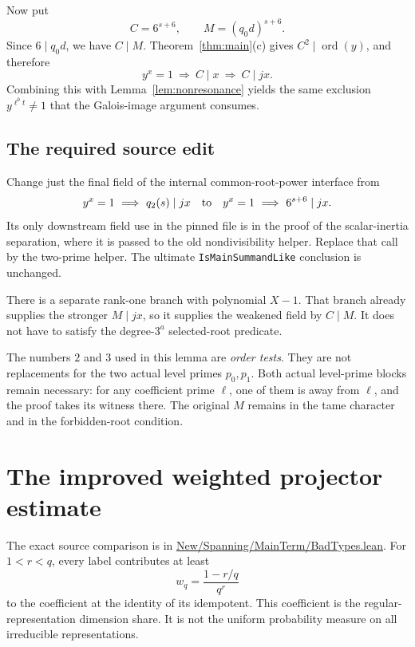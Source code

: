 \documentclass[11pt,a4paper]{article}
\theoremstyle{definition}
\theoremstyle{remark}
\newcommand{\ord}{\operatorname{ord}}
\newcommand{\code}[1]{{\small\nolinkurl{#1}}}
\newcommand{\src}[2]{\href{https://github.com/VladimirReshetnikov/ProveIt/blob/89d12dd40424f1217fd818d84877b3da52396a3b/Analysis/GeneralizedRiemannHypothesis/Lean/grh/src/#1.lean}{#2}}
\begin{document}
Now put
\begin{equation}
               C=6^{s+6},\qquad M=(q_0d)^{s+6}.
               \label{eq:orderC}
\end{equation}
Since \(6\mid q_0d\), we have \(C\mid M\).
Theorem~\ref{thm:main}(c) gives \(C^2\mid\ord(y)\), and therefore
\[
                       y^x=1\ \Longrightarrow\ C\mid x
                       \ \Longrightarrow\ C\mid jx .
\]
Combining this with Lemma~\ref{lem:nonresonance} yields the same exclusion
\(y^{\ell^b t}\ne1\) that the Galois-image argument consumes.

\subsection{The required source edit}

Change just the final field of the internal common-root-power interface from
\[
        y^x=1\ \Longrightarrow\ q_2(s)\mid jx
        \quad\hbox{to}\quad
        y^x=1\ \Longrightarrow\ 6^{s+6}\mid jx .
\]
Its only downstream field use in the pinned file is in the proof of the
scalar-inertia separation, where it is passed to the old nondivisibility helper.
Replace that call by the two-prime helper.
The ultimate \code{IsMainSummandLike} conclusion is unchanged.

There is a separate rank-one branch with polynomial \(X-1\).
That branch already supplies the stronger \(M\mid jx\), so it supplies the
weakened field by \(C\mid M\). It does not have to satisfy the degree-\(3^a\)
selected-root predicate.

The numbers \(2\) and \(3\) used in this lemma are \emph{order tests}.
They are not replacements for the two actual level primes \(p_0,p_1\).
Both actual level-prime blocks remain necessary: for any coefficient prime \(\ell\),
one of them is away from \(\ell\), and the proof takes its witness there.
The original \(M\) remains in the tame character and in the forbidden-root condition.

\section{The improved weighted projector estimate}
\label{sec:counting}

The exact source comparison is in
\src{New/Spanning/MainTerm/BadTypes}{New/Spanning/MainTerm/BadTypes.lean}.
For \(1<r<q\), every label contributes at least
\[
                         w_q=\frac{1-r/q}{q^r}
\]
to the coefficient at the identity of its idempotent. This coefficient is the
regular-representation dimension share. It is not the uniform probability
measure on all irreducible representations.
\end{document}

